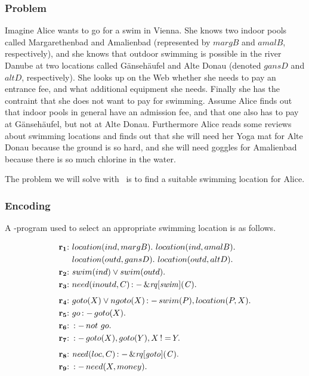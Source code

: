 \documentclass[a4paper, titlepage]{article}
\newcommand{\ext}[3]{\ensuremath{\&{\mathit{#1}}[#2](#3)}}
\DeclareMathOperator{\leftimpl}{:-}
\DeclareMathOperator{\noteq}{!=}
\newcommand{\rowprefix}[1]{%
  \ensuremath{\color{black}\mathbf{#1{:}}\ }%
}
\begin{document}
\subsubsection{Problem}
Imagine Alice wants to go for a swim in Vienna. She knows 
two indoor pools called Margarethenbad and Amalienbad 
(represented by $\mathit{margB}$ and $\mathit{amalB}$, 
respectively), and she knows that outdoor swimming is 
possible in the river Danube at two locations called 
G\"anseh\"aufel and Alte Donau (denoted $\mathit{gansD}$ and 
$\mathit{altD}$, respectively). She looks up on the Web 
whether she needs to pay an entrance fee, and what 
additional equipment she needs. Finally she has the 
contraint that she does not want to pay for swimming. 
Assume Alice finds out that indoor pools in general have an 
admission fee, and that one also
has to pay at G\"anseh\"aufel, but not at Alte Donau. 
Furthermore Alice reads some reviews about swimming 
locations and finds out that she will need her Yoga mat for 
Alte Donau because the ground is so hard, and she will need 
goggles for Amalienbad because there is so much chlorine in 
the water.

The problem we will solve with \hex\ is
to find a suitable swimming location for Alice.

\subsubsection{Encoding}

A \hex-program used to select
an appropriate swimming location is as follows.

\begin{align*}
\rowprefix{r_1}& location(ind, margB). \ location(ind, amalB). \ \\& 
location(outd, gansD). \ location(outd, altD). \\  
\rowprefix{r_2}& swim(ind) \vee swim(outd).\\ 
\rowprefix{r_3}& need(inoutd, C) \leftimpl \ext{\mathit{rq}}
{\mathit{swim}}{\mathit{C}}. \\[1ex]
\rowprefix{r_4}& goto(X) \vee ngoto(X) \leftimpl swim(P), 
location(P, X).\\
\rowprefix{r_5}& go \leftimpl goto(X).\\
\rowprefix{r_6}& \leftimpl not \ go. \\
\rowprefix{r_7}& \leftimpl goto(X), goto(Y), X \noteq Y. \\[1ex]
\rowprefix{r_8}& \mathit{need}(loc, C) \leftimpl 
\ext{\mathit{rq}}{\mathit{goto}}{\mathit{C}}. \\ 
\rowprefix{r_9}& \leftimpl need(X, money).
\end{align*}
\end{document}
